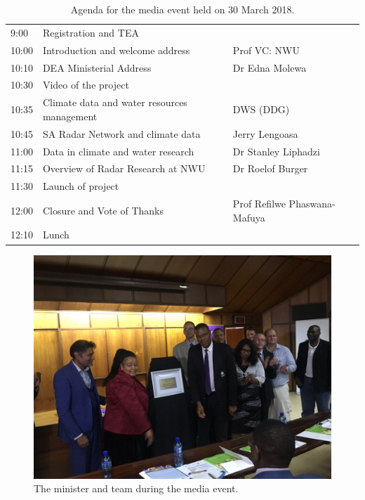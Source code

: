 \documentclass{wrcreport}
\begin{document}
\begin{table}[!htbp]
  \begin{center}
\caption{Agenda for the media event held on 30 March 2018.}
\label{table:launch}
\begin{tabular}{ l l l}
\toprule
9:00 & Registration and TEA & \\
10:00 & Introduction and welcome address & Prof VC: NWU \\
10:10 & DEA Ministerial Address & Dr Edna Molewa \\
10:30 & Video of the project & \\
10:35 & Climate data and water resources management & DWS (DDG) \\
10:45 & SA Radar Network and climate data & Jerry Lengoasa \\
11:00 & Data in climate and water research & Dr Stanley Liphadzi \\ 
11:15 & Overview of Radar Research at NWU & Dr Roelof Burger \\
11:30 & Launch of project & \\
12:00 & Closure and Vote of Thanks & Prof Refilwe Phaswana-Mafuya \\
12:10 & Lunch \\
\bottomrule
\end{tabular}
  \end{center}
\end{table}

\begin{figure}[!htp]
\includegraphics[width=\textwidth]{LekwenaLaunch-group} \caption[The minister and team during the media event.]{The minister and team during the media event.}
\label{fig:event}
\end{figure}
\end{document}
